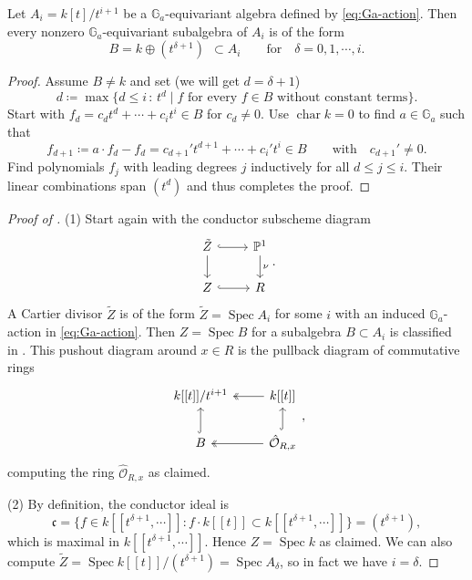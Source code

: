 \documentclass[reqno, letterpaper]{amsart}
\numberwithin{equation}{subsection}
\newcommand{\GG}{\mathbb{G}}
\newcommand{\PP}{\mathbb{P}}
\DeclareMathOperator{\Spec}{Spec}
\begin{document}
			\begin{lemma} \label{lem:Ga-subalgebra}
				Let $A_i = k[t] / t^{i+1}$ be a $\GG_a$-equivariant algebra defined by \eqref{eq:Ga-action}. Then every nonzero $\GG_a$-equivariant subalgebra of $A_i$ is of the form
				\[ B = k \oplus (t^{\delta+1}) \ \ \subset A_i \qquad\mbox{for}\quad \delta = 0, 1, \cdots, i .\]
			\end{lemma}
			\begin{proof}
				Assume $B \neq k$ and set (we will get $d = \delta + 1$)
				\[ d \coloneq \max \{ d \le i \, : \, t^d \mid f \mbox{ for every } f \in B \mbox{ without constant terms} \} .\]
				Start with $f_d = c_d t^d + \cdots + c_i t^i \in B$ for $c_d \neq 0$. Use $\operatorname{char} k = 0$ to find $a \in \GG_a$ such that
				\[ f_{d+1} \coloneq a \cdot f_d - f_d = c_{d+1}' t^{d+1} + \cdots + c_i' t^i \in B \qquad\mbox{with}\quad c_{d+1}' \neq 0 .\]
				Find polynomials $f_j$ with leading degrees $j$ inductively for all $d \le j \le i$. Their linear combinations span $(t^d)$ and thus completes the proof.
			\end{proof}
			
			\begin{proof}[Proof of ]
				(1) Start again with the conductor subscheme diagram
				\[\begin{tikzcd}
					\tilde Z \arrow[r, hook] \arrow[d] & \PP^1 \arrow[d, "\nu"] \\
					Z \arrow[r, hook] & R
				\end{tikzcd}.\]
				A Cartier divisor $\tilde Z$ is of the form $\tilde Z = \Spec A_i$ for some $i$ with an induced $\GG_a$-action in \eqref{eq:Ga-action}. Then $Z = \Spec B$ for a subalgebra $B \subset A_i$ is classified in . This pushout diagram around $x \in R$ is the pullback diagram of commutative rings
				\[\begin{tikzcd}
					k[[t]]/t^{i+1} & k[[t]] \arrow[l, twoheadrightarrow] \\
					B \arrow[u, hook] & \hat {\mathcal O}_{R, x} \arrow[l, twoheadrightarrow] \arrow[u, hook]
				\end{tikzcd},\]
				computing the ring $\hat {\mathcal O}_{R, x}$ as claimed.
				
				\medskip
				
				(2) By definition, the conductor ideal is
				\[ \mathfrak c = \big\{ f \in k[[t^{\delta+1}, \cdots]] : f \cdot k[[t]] \subset k[[t^{\delta+1}, \cdots]] \big\} = (t^{\delta+1}) ,\]
				which is maximal in $k[[t^{\delta+1}, \cdots]]$. Hence $Z = \Spec k$ as claimed. We can also compute $\tilde Z = \Spec k[[t]] / (t^{\delta+1}) = \Spec A_{\delta}$, so in fact we have $i = \delta$.
			\end{proof}
			
\end{document}
